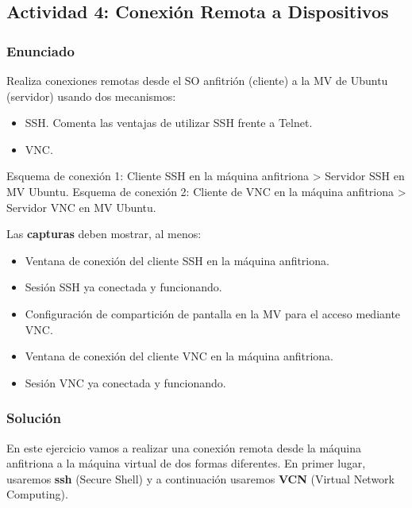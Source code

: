 \subsection{Actividad 4: Conexión Remota a Dispositivos}

\subsubsection{Enunciado}
Realiza conexiones remotas desde el SO anfitrión (cliente) a la MV de Ubuntu (servidor) usando dos mecanismos:

\begin{itemize}
    \item SSH. Comenta las ventajas de utilizar SSH frente a Telnet.
    \item VNC.
\end{itemize}

Esquema de conexión 1: Cliente SSH en la máquina anfitriona > Servidor SSH en MV Ubuntu.
Esquema de conexión 2: Cliente de VNC en la máquina anfitriona > Servidor VNC en MV Ubuntu.

Las \textbf{capturas} deben mostrar, al menos:
\begin{itemize}
    \item Ventana de conexión del cliente SSH en la máquina anfitriona.
    \item Sesión SSH ya conectada y funcionando.
    \item Configuración de compartición de pantalla en la MV para el acceso mediante VNC.
    \item Ventana de conexión del cliente VNC en la máquina anfitriona.
    \item Sesión VNC ya conectada y funcionando.
\end{itemize}

\subsubsection{Solución}
En este ejercicio vamos a realizar una conexión remota desde la máquina anfitriona a la máquina virtual de dos formas diferentes. En primer lugar, usaremos \textbf{ssh} (Secure Shell) y a continuación usaremos \textbf{VCN} (Virtual Network Computing).

